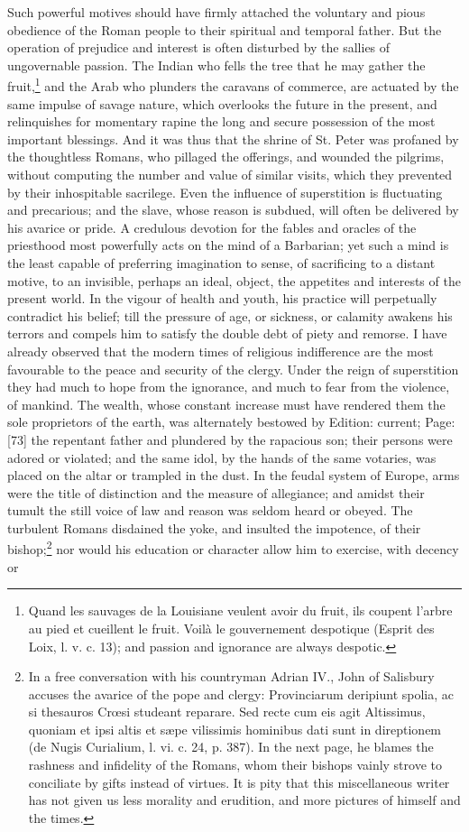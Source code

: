 Such powerful motives should have firmly attached the voluntary and pious obedience of the Roman people to their spiritual and temporal father. But the operation of prejudice and interest is often disturbed by the sallies of ungovernable passion. The Indian who fells the tree that he may gather the fruit,\footnote{Quand les sauvages de la Louisiane veulent avoir du fruit, ils coupent l\texthebrew{}’arbre au pied et cueillent le fruit. Voilà le gouvernement despotique (Esprit des Loix, l. v. c. 13); and passion and ignorance are always despotic.} and the Arab who plunders the caravans of commerce, are actuated by the same impulse of savage nature, which overlooks the future in the present, and relinquishes for momentary rapine the long and secure possession of the most important blessings. And it was thus that the shrine of St. Peter was profaned by the thoughtless Romans, who pillaged the offerings, and wounded the pilgrims, without computing the number and value of similar visits, which they prevented by their inhospitable sacrilege. Even the influence of superstition is fluctuating and precarious; and the slave, whose reason is subdued, will often be delivered by his avarice or pride. A credulous devotion for the fables and oracles of the priesthood most powerfully acts on the mind of a Barbarian; yet such a mind is the least capable of preferring imagination to sense, of sacrificing to a distant motive, to an invisible, perhaps an ideal, object, the appetites and interests of the present world. In the vigour of health and youth, his practice will perpetually contradict his belief; till the pressure of age, or sickness, or calamity awakens his terrors and compels him to satisfy the double debt of piety and remorse. I have already observed that the modern times of religious indifference are the most favourable to the peace and security of the clergy. Under the reign of superstition they had much to hope from the ignorance, and much to fear from the violence, of mankind. The wealth, whose constant increase must have rendered them the sole proprietors of the earth, was alternately bestowed by Edition: current; Page: [73] the repentant father and plundered by the rapacious son; their persons were adored or violated; and the same idol, by the hands of the same votaries, was placed on the altar or trampled in the dust. In the feudal system of Europe, arms were the title of distinction and the measure of allegiance; and amidst their tumult the still voice of law and reason was seldom heard or obeyed. The turbulent Romans disdained the yoke, and insulted the impotence, of their bishop;\footnote{In a free conversation with his countryman Adrian IV., John of Salisbury accuses the avarice of the pope and clergy: Provinciarum deripiunt spolia, ac si thesauros Crœsi studeant reparare. Sed recte cum eis agit Altissimus, quoniam et ipsi altis et sæpe vilissimis hominibus dati sunt in direptionem (de Nugis Curialium, l. vi. c. 24, p. 387). In the next page, he blames the rashness and infidelity of the Romans, whom their bishops vainly strove to conciliate by gifts instead of virtues. It is pity that this miscellaneous writer has not given us less morality and erudition, and more pictures of himself and the times.} nor would his education or character allow him to exercise, with decency or 